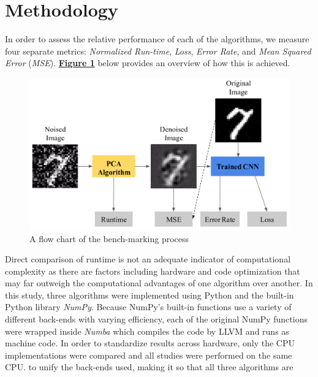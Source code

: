 \documentclass[12pt]{article}
\begin{document}

\section{Methodology} \label{4}

    In order to assess the relative performance of each of the algorithms, we measure four separate metrics: \textit{Normalized Run-time}, \textit{Loss},  \textit{Error Rate}, and \textit{Mean Squared Error} (\textit{MSE}). \textbf{\hyperref[methodology]{Figure \ref*{methodology}}} below provides an overview of how this is achieved.

    \begin{figure}[H]
    \begin{center}
    \includegraphics[width=\textwidth]{Methodology.png}
    \caption{A flow chart of the bench-marking process}
    \label{methodology}
    \end{center}
    \end{figure}

    Direct comparison of runtime is not an adequate indicator of computational complexity as there are factors including hardware and code optimization that may far outweigh the computational advantages of one algorithm over another. In this study, three algorithms were implemented using Python and the built-in Python library \textit{NumPy}. Because NumPy's built-in functions use a variety of different back-ends with varying efficiency, each of the original NumPy functions were wrapped inside \textit{Numba} which compiles the code by LLVM and runs as machine code. In order to standardize results across hardware, only the CPU implementations were compared and all studies were performed on the same CPU. to unify the back-ends used, making it so that all three algorithms are
\end{document}
